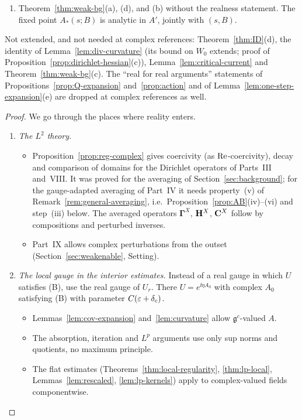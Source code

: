 \begin{proposition}
\begin{enumerate}[label=(\alph*)]
\item Theorem~\ref{thm:weak-bg}(a), (d), and (b) without the realness statement. The fixed point $A_*(s;B)$ is analytic in $A'$, jointly with $(s,B)$.
\end{enumerate}
Not extended, and not needed at complex references: Theorem~\ref{thm:ID}(d), the identity of Lemma~\ref{lem:div-curvature} (its bound on $W_0$ extends; proof of Proposition~\ref{prop:dirichlet-hessian}(c)), Lemma~\ref{lem:critical-current} and Theorem~\ref{thm:weak-bg}(c). The ``real for real arguments'' statements of Propositions~\ref{prop:Q-expansion} and~\ref{prop:action} and of Lemma~\ref{lem:one-step-expansion}(e) are dropped at complex references as well.
\end{proposition}

\begin{proof}
We go through the places where reality enters.
\begin{enumerate}[label=(\roman*)]
\item \emph{The $L^2$ theory.}
  \begin{itemize}
  \item Proposition~\ref{prop:reg-complex} gives coercivity (as $\operatorname{Re}$-coercivity), decay and comparison of domains for the Dirichlet operators of Parts~III and~VIII. It was proved for the averaging of Section~\ref{sec:background}; for the gauge-adapted averaging of Part~IV it needs property~(v) of Remark~\ref{rem:general-averaging}, i.e.\ Proposition~\ref{prop:AB}(iv)--(vi) and step~(iii) below. The averaged operators $\boldsymbol\Gamma^X$, $\mathbf H^X$, $\mathbf C^X$ follow by compositions and perturbed inverses.
  \item Part~IX allows complex perturbations from the outset (Section~\ref{sec:weakenable}, Setting).
  \end{itemize}
\item \emph{The local gauge in the interior estimates.} Instead of a real gauge in which $U$ satisfies (B), use the real gauge of $U_r$. There $U=e^{\ii\eta A_0}$ with complex $A_0$ satisfying (B) with parameter $C(\varepsilon+\delta_c)$.
  \begin{itemize}
  \item Lemmas~\ref{lem:cov-expansion} and~\ref{lem:curvature} allow $\mathfrak g^c$-valued $A$.
  \item The absorption, iteration and $L^p$ arguments use only sup norms and quotients, no maximum principle.
  \item The flat estimates (Theorems~\ref{thm:local-regularity}, \ref{thm:lp-local}, Lemmas~\ref{lem:rescaled}, \ref{lem:lp-kernels}) apply to complex-valued fields componentwise.

\end{itemize}
\end{enumerate}
\end{proof}
